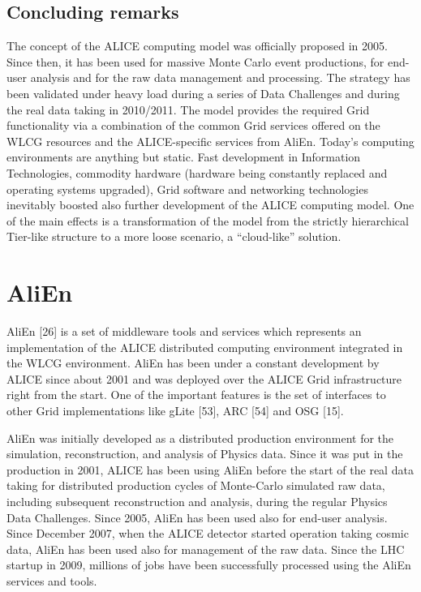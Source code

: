 \documentclass{intech}
\begin{document}
\subsection{Concluding remarks}
%
The concept of the ALICE computing model was officially proposed in
2005. Since then, it has been used for massive Monte Carlo event
productions, for end-user analysis and for the raw data management
and processing. The strategy has been validated under heavy load
during a series of Data Challenges and during the real data taking
in 2010/2011. The model provides the required Grid functionality via
a combination of the common Grid services offered on the WLCG
resources and the ALICE-specific services from AliEn. Today's
computing environments are anything but static. Fast development in
Information Technologies, commodity hardware (hardware being
constantly replaced and operating systems upgraded), Grid software
and networking technologies inevitably boosted also further
development of the ALICE computing model. One of the main effects is
a transformation of the model from the strictly hierarchical
Tier-like structure to a more loose scenario, a ``cloud-like''
solution.


\section{AliEn}

AliEn [26] is a set of middleware tools and services which represents
an implementation of the ALICE distributed computing environment
integrated in the WLCG environment. AliEn has been under a constant
development by ALICE since about 2001 and was deployed over the
ALICE Grid infrastructure right from the start. One of the important
features is the set of interfaces to other Grid implementations like
gLite [53], ARC [54] and OSG [15].

AliEn was initially developed as a distributed production
environment for the simulation, reconstruction, and analysis of
Physics data. Since it was put in the production in 2001, ALICE has
been using AliEn before the start of  the real data taking for
distributed production cycles of Monte-Carlo simulated raw data,
including subsequent reconstruction and analysis, during the regular
Physics Data Challenges. Since 2005, AliEn has been used also for
end-user analysis.  Since December 2007, when the ALICE detector
started operation taking cosmic data, AliEn has been used also for
management of the raw data.  Since the LHC startup in 2009, millions
of jobs have been successfully processed using the AliEn services
and tools.
\end{document}
